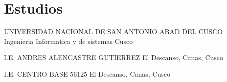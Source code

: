 \section{Estudios}
            {UNIVERSIDAD NACIONAL DE SAN ANTONIO ABAD DEL CUSCO}
            {Ingenieria Informatica y de sistemas}
            {Cusco}
            {}
            {}
            
            {I.E. ANDRES ALENCASTRE GUTIERREZ}
            {}
            {El Descanso, Canas, Cusco}
            {}
            {} 
    
            {I.E. CENTRO BASE 56125}
            {}
            {El Descanso, Canas, Cusco}
            {}
            {}